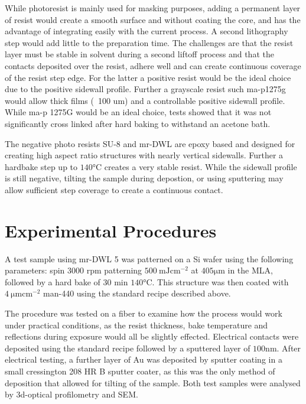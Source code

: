 While photoresist is mainly used for masking purposes, adding a permanent layer of resist would create a smooth surface and without coating the core, and has the advantage of integrating easily with the current process. A second lithography step would add little to the preparation time. The challenges are that the resist layer must be stable in solvent during a second liftoff process and that the contacts deposited over the resist, adhere well and can create continuous coverage of the resist step edge. For the latter a positive resist would be the ideal choice due to the positive sidewall profile. Further a grayscale resist such ma-p1275g  would allow thick films (~100 um) and a controllable positive sidewall profile. While ma-p 1275G would be an ideal choice, tests showed that it was not significantly cross linked after hard baking to withstand an acetone bath. 


The negative photo resists SU-8 and mr-DWL are epoxy based and designed for creating high aspect ratio structures with nearly vertical sidewalls. Further a hardbake step up to  $140 \si{\celsius}$  creates a very stable resist. While the sidewall profile is still negative, tilting the sample during depostion, or using sputtering may allow sufficient step coverage to create a continuous contact. 

\section{Experimental Procedures}
A test sample using mr-DWL 5 was patterned on a Si wafer using the following parameters: spin 3000 rpm patterning $\SI{500}{\milli \joule \cm^{-2}}$ at $405 \si{\micro\meter}$ in the MLA, followed by a hard bake of 30 min $140 \si{\celsius}$. This structure was then coated with $\SI{4}{\micro \meter \cm^{-2}}$ man-440 using the standard recipe described above. 

The procedure was tested on a fiber to examine how the process would work under practical conditions, as the resist thickness, bake temperature and reflections during exposure would all be slightly effected. Electrical contacts were deposited using the standard recipe followed by a sputtered layer of $100 \si{\nano \meter}$. After electrical testing, a further layer of Au was deposited by sputter coating in a small cressington 208 HR B sputter coater, as this was the only method of deposition that allowed for tilting of the sample. Both test samples were analysed by 3d-optical profilometry and SEM. 

